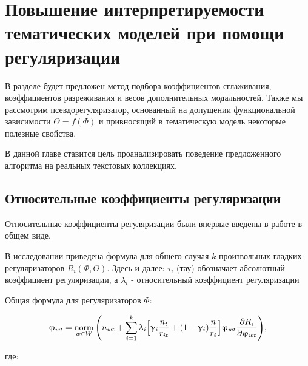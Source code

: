 \chapter{Повышение интерпретируемости тематических моделей при помощи регуляризации}

В разделе будет предложен метод подбора коэффициентов сглаживания, коэффициентов разреживания и весов дополнительных модальностей. Также мы рассмотрим псевдорегуляризатор, основанный на допущении функциональной зависимости $\Theta = f(\Phi)$ и привносящий в тематическую модель некоторые полезные свойства.

В данной главе ставится цель проанализировать поведение предложенного алгоритма на реальных текстовых коллекциях.

\section{Относительные коэффициенты регуляризации} \label{relative}



Относительные коэффициенты регуляризации были впервые введены в работе \cite{doykov} в общем виде.


В исследовании \cite{doykov} приведена формула для общего случая $k$ произвольных гладких регуляризаторов $R_i(\Phi, \Theta)$. Здесь и далее: $\tau_i$ (тау) обозначает абсолютный коэффициент регуляризации, а $\lambda_i$ - относительный коэффициент регуляризации

Общая формула для регуляризаторов $\Phi$:

\[
\upvarphi_{wt} = \mathop{\mathrm{norm}}\limits_{w \in W}\Bigg(
    n_{wt} + \sum_{i=1}^k \uplambda_i \Big[
        \upgamma_i \frac{n_t}{r_{it}} + (1-\upgamma_i)\frac{n}{r_i}
        \Big]
    \upvarphi_{wt} \frac{\partial R_i}{\partial \upvarphi_{wt}}
\Bigg), \label{rel_phi_general}
\]

где:

